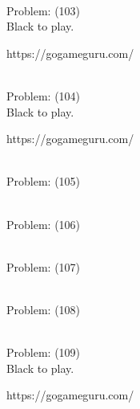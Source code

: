 \documentclass[11pt]{article}
\begin{document}
\begin{minipage}[t]{0.5\textwidth}
  {\centering
  
\\
  Problem: (103)\\
  Black to play.

https://gogameguru.com/\\
  }
\end{minipage}
\begin{minipage}[t]{0.5\textwidth}
  {\centering
  
\\
  Problem: (104)\\
  Black to play.

https://gogameguru.com/\\
  }
\end{minipage}
\begin{minipage}[t]{0.5\textwidth}
  {\centering
  
\\
  Problem: (105)\\
  
  }
\end{minipage}
\begin{minipage}[t]{0.5\textwidth}
  {\centering
  
\\
  Problem: (106)\\
  
  }
\end{minipage}
\begin{minipage}[t]{0.5\textwidth}
  {\centering
  
\\
  Problem: (107)\\
  
  }
\end{minipage}
\begin{minipage}[t]{0.5\textwidth}
  {\centering
  
\\
  Problem: (108)\\
  
  }
\end{minipage}
\begin{minipage}[t]{0.5\textwidth}
  {\centering
  
\\
  Problem: (109)\\
  Black to play.

https://gogameguru.com/\\
  }
\end{minipage}
\end{document}
